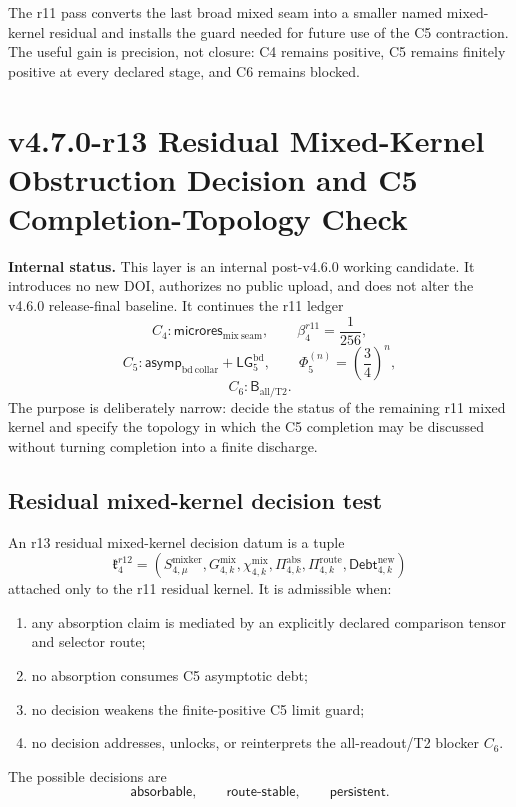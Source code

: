 \begin{remark}[r11 summary]
The r11 pass converts the last broad mixed seam into a smaller named mixed-kernel
residual and installs the guard needed for future use of the C5 contraction.  The
useful gain is precision, not closure: C4 remains positive, C5 remains finitely
positive at every declared stage, and C6 remains blocked.
\end{remark}


\section{v4.7.0-r13 Residual Mixed-Kernel Obstruction Decision and C5 Completion-Topology Check}
\label{sec:v470-r13-mixed-kernel-decision-completion-topology}

\noindent\textbf{Internal status.} This layer is an internal post-v4.6.0 working
candidate.  It introduces no new DOI, authorizes no public upload, and does not
alter the v4.6.0 release-final baseline.  It continues the r11 ledger
\[
C_4:\mathsf{microres}_{\mathrm{mix\ seam}},\qquad \beta_4^{r11}=\frac1{256},
\]
\[
C_5:\mathsf{asymp}_{\mathrm{bd\ collar}}+\mathsf{LG}_5^{\mathrm{bd}},\qquad
\Phi_5^{(n)}=\left(\frac34\right)^n,
\]
\[
C_6:\mathsf B_{\mathrm{all/T2}}.
\]
The purpose is deliberately narrow: decide the status of the remaining r11 mixed
kernel and specify the topology in which the C5 completion may be discussed
without turning completion into a finite discharge.

\subsection{Residual mixed-kernel decision test}
\label{subsec:v470-r13-residual-mixed-kernel-decision}

\begin{definition}
\label{def:v470-r13-residual-mixed-kernel-decision-datum}
An r13 residual mixed-kernel decision datum is a tuple
\[
\mathfrak k_4^{r12}
=
(S_{4,\mu}^{\mathrm{mixker}},G_{4,k}^{\mathrm{mix}},
 \chi_{4,k}^{\mathrm{mix}},\Pi_{4,k}^{\mathrm{abs}},
 \Pi_{4,k}^{\mathrm{route}},\mathsf{Debt}_{4,k}^{\mathrm{new}})
\]
attached only to the r11 residual kernel.  It is admissible when:
\begin{enumerate}[label=(\roman*)]
\item any absorption claim is mediated by an explicitly declared comparison tensor
      and selector route;
\item no absorption consumes C5 asymptotic debt;
\item no decision weakens the finite-positive C5 limit guard;
\item no decision addresses, unlocks, or reinterprets the all-readout/T2 blocker
      \(C_6\).
\end{enumerate}
The possible decisions are
\[
\mathsf{absorbable},\qquad \mathsf{route\mbox{-}stable},\qquad
\mathsf{persistent}.
\]
\end{definition}

